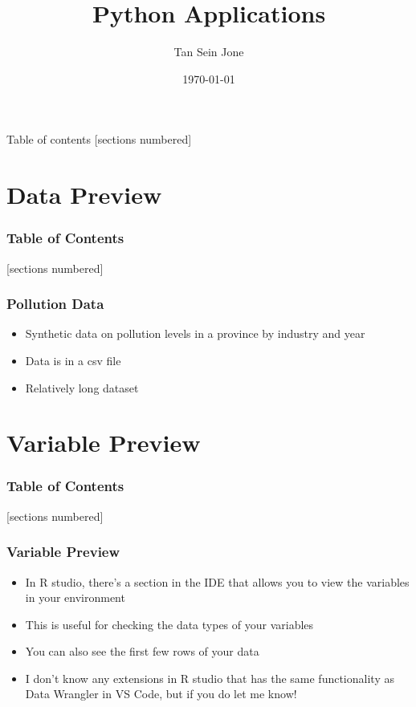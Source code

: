 \documentclass[serif, 9pt, aspectratio=32]{beamer}
\title{Python Applications}
\date{\today}
\author{Tan Sein Jone}
\institute{University of British Columbia}
\begin{document}
\maketitle

\begin{frame}{Table of contents}
    [sections numbered]
    \tableofcontents[hideallsubsections]
\end{frame}

\section{Data Preview}

\begin{frame}
    \frametitle{Table of Contents}
    [sections numbered]
    \tableofcontents[currentsection]
\end{frame}

\begin{frame}
    \centering
    \frametitle{Pollution Data}
    \begin{itemize}
        \setlength{\itemsep}{2em}
        \item Synthetic data on pollution levels in a province by industry and year
        \item Data is in a csv file
        \item Relatively long dataset
    \end{itemize}
\end{frame}

\section{Variable Preview}

\begin{frame}
    \frametitle{Table of Contents}
    [sections numbered]
    \tableofcontents[currentsection]
\end{frame}

\begin{frame}
    \centering
    \frametitle{Variable Preview}
    \begin{itemize}
        \setlength{\itemsep}{2em}
        \item In R studio, there's a section in the IDE that allows you to view the variables in your environment
        \item This is useful for checking the data types of your variables
        \item You can also see the first few rows of your data
        \item I don't know any extensions in R studio that has the same functionality as Data Wrangler in VS Code, but if you do let me know!
    \end{itemize}
\end{frame}
\end{document}
